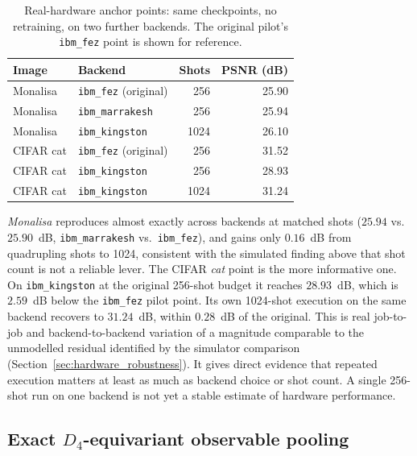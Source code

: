 \documentclass[pdflatex,sn-basic]{sn-jnl}
\begin{document}
\begin{table}[t]
  \centering
  \caption{Real-hardware anchor points: same checkpoints, no retraining, on two
           further backends. The original pilot's \texttt{ibm\_fez} point is
           shown for reference.}
  \label{tab:hardware_anchors}
  \begin{tabular}{@{}l l r r@{}}
    \toprule
    Image       & Backend                       & Shots & PSNR (dB) \\
    \midrule
    Monalisa    & \texttt{ibm\_fez} (original)  &  256  & 25.90     \\
    Monalisa    & \texttt{ibm\_marrakesh}       &  256  & 25.94     \\
    Monalisa    & \texttt{ibm\_kingston}        & 1024  & 26.10     \\
    \addlinespace
    CIFAR cat   & \texttt{ibm\_fez} (original)  &  256  & 31.52     \\
    CIFAR cat   & \texttt{ibm\_kingston}        &  256  & 28.93     \\
    CIFAR cat   & \texttt{ibm\_kingston}        & 1024  & 31.24     \\
    \bottomrule
  \end{tabular}
\end{table}

\textit{Monalisa} reproduces almost exactly across backends at matched shots
($25.94$ vs.\ $25.90$~dB, \texttt{ibm\_marrakesh} vs.\ \texttt{ibm\_fez}), and
gains only $0.16$~dB from quadrupling shots to 1024, consistent with the
simulated finding above that shot count is not a reliable lever. The CIFAR
\textit{cat} point is the more informative one. On \texttt{ibm\_kingston} at the
original 256-shot budget it reaches $28.93$~dB, which is $2.59$~dB below the
\texttt{ibm\_fez} pilot point. Its own 1024-shot execution on the same backend
recovers to $31.24$~dB, within $0.28$~dB of the original. This is real
job-to-job and backend-to-backend variation of a magnitude comparable to the
unmodelled residual identified by the simulator comparison
(Section~\ref{sec:hardware_robustness}).
It gives direct evidence that repeated execution matters at least as much as
backend choice or shot count. A single 256-shot run on one backend is not yet a
stable estimate of hardware performance.

\subsection{Exact \texorpdfstring{$D_4$}{D4}-equivariant observable pooling}
\label{sec:d4}
\label{sec:symmetry}
\end{document}
